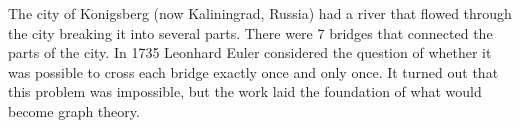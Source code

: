  {} The city of K$\ddot{\text{o}}$nigsberg (now Kaliningrad, Russia)
had a river that flowed through the city breaking it into several parts. There
were 7 bridges that connected the parts of the city. In 1735 Leonhard Euler
considered the question of whether it was possible to cross each bridge
exactly once and only once. It turned out that this problem was impossible,
but the work laid the foundation of what would become graph theory.

